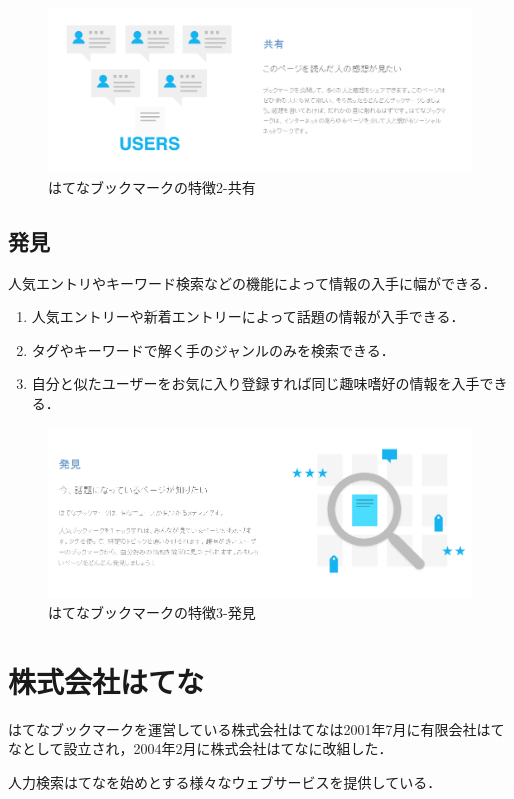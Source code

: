 \begin{figure}[htb]
\centering
\includegraphics[width=13cm]{kyo.PNG}
\caption{はてなブックマークの特徴2-共有}\label{kyouyuu}
\end{figure}

\newpage

\subsection{発見}
人気エントリやキーワード検索などの機能によって情報の入手に幅ができる．


\begin{enumerate}
\item 人気エントリーや新着エントリーによって話題の情報が入手できる．
\item タグやキーワードで解く手のジャンルのみを検索できる．
\item 自分と似たユーザーをお気に入り登録すれば同じ趣味嗜好の情報を入手できる．
\end{enumerate}


\begin{figure}[htb]
\centering
\includegraphics[width=13cm]{hak.PNG}
\caption{はてなブックマークの特徴3-発見}\label{hakken}
\end{figure}


\newpage

\section{株式会社はてな}
はてなブックマークを運営している株式会社はてなは2001年7月に有限会社はてなとして設立され，2004年2月に株式会社はてなに改組した\cite{hatena-history}．\par
人力検索はてなを始めとする様々なウェブサービスを提供している\cite{hatena-info}．\par

